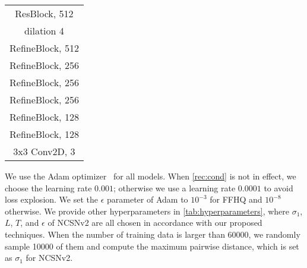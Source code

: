 \documentclass{article}
\begin{document}
\begin{table}[H]
\begin{subtable}[t]{0.3\linewidth}
\begin{tabular}{c}
        \midrule
        ResBlock, 512 \\ dilation 4\\
        \midrule
        RefineBlock, 512\\
        \midrule
        RefineBlock, 256\\
        \midrule
        RefineBlock, 256\\
        \midrule
        RefineBlock, 256\\
        \midrule
        RefineBlock, 128\\
        \midrule
        RefineBlock, 128\\
        \midrule
        3x3 Conv2D, 3\\
        \bottomrule
        \end{tabular}
    \end{subtable}
\end{table}

We use the Adam optimizer~\cite{kingma2014adam} for all models. When \cref{rec:cond} is not in effect, we choose the learning rate $0.001$; otherwise we use a learning rate $0.0001$ to avoid loss explosion. We set the $\epsilon$ parameter of Adam to $10^{-3}$ for FFHQ and $10^{-8}$ otherwise. We provide other hyperparameters in \cref{tab:hyperparameters}, where $\sigma_1$, $L$, $T$, and $\epsilon$ of NCSNv2 are all chosen in accordance with our proposed techniques. When the number of training data is larger than 60000, we randomly sample 10000 of them and compute the maximum pairwise distance, which is set as $\sigma_1$ for NCSNv2.
\end{document}
